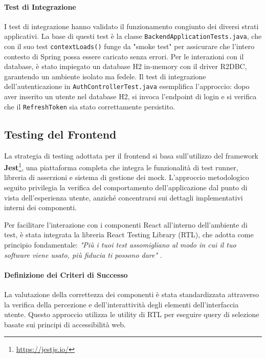 \documentclass[12pt,a4paper,openright,twoside]{book}
\begin{document}
\paragraph{Test di Integrazione}
I test di integrazione hanno validato il funzionamento congiunto dei diversi strati applicativi. La base di questi test è la classe \texttt{BackendApplicationTests.java}, che con il suo test \texttt{contextLoads()} funge da "smoke test" per assicurare che l'intero contesto di Spring possa essere caricato senza errori. Per le interazioni con il database, è stato impiegato un database H2 in-memory con il driver R2DBC, garantendo un ambiente isolato ma fedele. Il test di integrazione dell'autenticazione in \texttt{AuthControllerTest.java} esemplifica l'approccio: dopo aver inserito un utente nel database H2, si invoca l'endpoint di login e si verifica che il \texttt{RefreshToken} sia stato correttamente persistito.

\subsection{Testing del Frontend}

La strategia di testing adottata per il frontend si basa sull'utilizzo del framework \textbf{Jest}\footnote{\url{https://jestjs.io/}}, una piattaforma completa che integra le funzionalità di test runner, libreria di asserzioni e sistema di gestione dei mock. L'approccio metodologico seguito privilegia la verifica del comportamento dell'applicazione dal punto di vista dell'esperienza utente, anziché concentrarsi sui dettagli implementativi interni dei componenti.

Per facilitare l'interazione con i componenti React all'interno dell'ambiente di test, è stata integrata la libreria React Testing Library (RTL), che adotta come principio fondamentale: \textit{"Più i tuoi test assomigliano al modo in cui il tuo software viene usato, più fiducia ti possono dare"} \cite{react_testing_library}.

\paragraph{Definizione dei Criteri di Successo}

La valutazione della correttezza dei componenti è stata standardizzata attraverso la verifica della percezione e dell'interattività degli elementi dell'interfaccia utente. Questo approccio utilizza le utility di RTL per eseguire query di selezione basate sui principi di accessibilità web.
\end{document}
